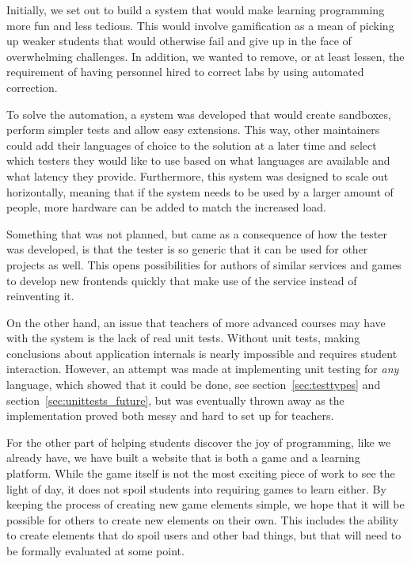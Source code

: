 Initially, we set out to build a system that would make learning programming more fun and less tedious. This would involve gamification as a mean of picking up weaker students that would otherwise fail and give up in the face of overwhelming challenges. In addition, we wanted to remove, or at least lessen, the requirement of having personnel hired to correct labs by using automated correction.

To solve the automation, a system was developed that would create sandboxes, perform simpler tests and allow easy extensions. This way, other maintainers could add their languages of choice to the solution at a later time and select which testers they would like to use based on what languages are available and what latency they provide. Furthermore, this system was designed to scale out horizontally, meaning that if the system needs to be used by a larger amount of people, more hardware can be added to match the increased load.

Something that was not planned, but came as a consequence of how the tester was developed, is that the tester is so generic that it can be used for other projects as well. This opens possibilities for authors of similar services and games to develop new frontends quickly that make use of the service instead of reinventing it.

On the other hand, an issue that teachers of more advanced courses may have with the system is the lack of real unit tests. Without unit tests, making conclusions about application internals is nearly impossible and requires student interaction. However, an attempt was made at implementing unit testing for \emph{any} language, which showed that it could be done, see section~\ref{sec:testtypes} and section~\ref{sec:unittests_future}, but was eventually thrown away as the implementation proved both messy and hard to set up for teachers.

For the other part of helping students discover the joy of programming, like we already have, we have built a website that is both a game and a learning platform. While the game itself is not the most exciting piece of work to see the light of day, it does not spoil students into requiring games to learn either. By keeping the process of creating new game elements simple, we hope that it will be possible for others to create new elements on their own. This includes the ability to create elements that do spoil users and other bad things, but that will need to be formally evaluated at some point.

